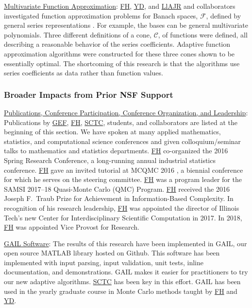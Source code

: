 \documentclass[11pt]{NSFamsart}
\newcommand{\Upara}[1]{\noindent\underline{#1}:\xspace}
\newcommand{\FH}{\hyperlink{FHlink}{FH}\xspace}
\newcommand{\SCTC}{\hyperlink{SCTClink}{SCTC}\xspace}
\newcommand{\GEF}{\hyperlink{GEFlink}{GEF}\xspace}
\newcommand{\YD}{\hyperlink{YDlink}{YD}\xspace}
\newcommand{\LlAJR}{\hyperlink{LlAJRlink}{LlAJR}\xspace}
\newcommand{\GAIL}{GAIL\xspace}
\newcommand{\MATLAB}{MATLAB\xspace}
\newcommand{\Rlang}{R\xspace}
\newcommand{\calc}{{\mathcal{C}}}
\newcommand{\calf}{{\mathcal{F}}}
\begin{document}
\Upara{Multivariate Function Approximation}
\FH, \YD, and \LlAJR and collaborators investigated function approximation problems for Banach spaces, $\calf$, defined by general series representations \cite{DinHic20a,DinEtal20a}.  For example, the bases can be general multivariate polynomials.  Three different definitions of a cone, $\calc$, of functions were defined, all describing a reasonable behavior of the series coefficients.  Adaptive function approximation algorithms were constructed for these three cones shown to be essentially optimal.  The shortcoming of this research is that the algorithms use series coefficients as data rather than function values. 


\subsubsection{Broader Impacts from Prior NSF Support} \label{prevBIsect}
\phantom{a}

\Upara{Publications, Conference Participation, Conference Organization, and Leadership} Publications by \GEF, \FH,  \SCTC, students, and collaborators are listed at the beginning of this section.  We have spoken at many applied mathematics, statistics, 
and computational science conferences and given colloquium/seminar talks to mathematics and 
statistics departments.  \FH co-organized the 
2016 Spring Research 
Conference, a long-running annual industrial statistics conference.   \FH gave an invited tutorial
at MCQMC 2016
\cite{Hic17a}, a biennial conference for which he serves on the steering committee.  \FH 
was a program leader for the SAMSI 2017--18 Quasi-Monte Carlo (QMC) Program.   \FH received the 2016 Joseph F.\ Traub Prize for Achievement in Information-Based Complexity. In recognition of his research leadership, \FH was appointed the director of Illinois Tech's new Center for Interdisciplinary 
Scientific Computation in 2017.  In 2018, \FH was appointed Vice Provost for Research.

\Upara{\GAIL Software} The results of this research have been implemented in 
\GAIL, our open source \MATLAB library hosted on
Github. This software 
has been implemented with input parsing, input validation, unit tests, inline documentation, and 
demonstrations.  \GAIL makes it easier for practitioners to try our new adaptive algorithms.  \SCTC has been key in this effort.  \GAIL has been used in the yearly graduate course in Monte Carlo methods taught by \FH and \YD.  
\end{document}
